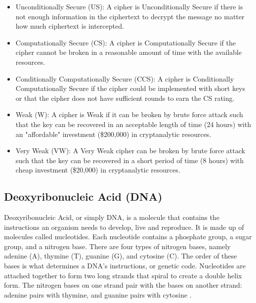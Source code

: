\begin{enumerate}
    \begin{itemize}
        \item Unconditionally Secure (US): A cipher is Unconditionally Secure if there is not enough information in the ciphertext to decrypt the message no matter how much ciphertext is intercepted.
        \item Computationally Secure (CS): A cipher is Computationally Secure if the cipher cannot be broken in a reasonable amount of time with the available resources.
        \item Conditionally Computationally Secure (CCS): A cipher is Conditionally Computationally Secure if the cipher could be implemented with short keys or that the cipher does not have sufficient rounds to earn the CS rating.
        \item Weak (W): A cipher is Weak if it can be broken by brute force attack such that the key can be recovered in an acceptable length of time (24 hours) with an "affordable" investment (\$200,000) in cryptanalytic resources.
        \item Very Weak (VW): A Very Weak cipher can be broken by brute force attack such that the key can be recovered in a short period of time (8 hours) with cheap investment (\$20,000) in cryptanalytic resources.
    \end{itemize}
\end{enumerate}

\subsection{Deoxyribonucleic Acid (DNA)}

Deoxyribonucleic Acid, or simply DNA, is a molecule that contains the instructions an organism needs to develop, live and reproduce. It is made up of molecules called nucleotides. Each nucleotide contains a phosphate group, a sugar group, and a nitrogen base. There are four types of nitrogen bases, namely adenine (A), thymine (T), guanine (G), and cytosine (C). The order of these bases is what determines a DNA’s instructions, or genetic code. Nucleotides are attached together to form two long strands that spiral to create a double helix form. The nitrogen bases on one strand pair with the bases on another strand: adenine pairs with thymine, and guanine pairs with cytosine \cite{dna}.

